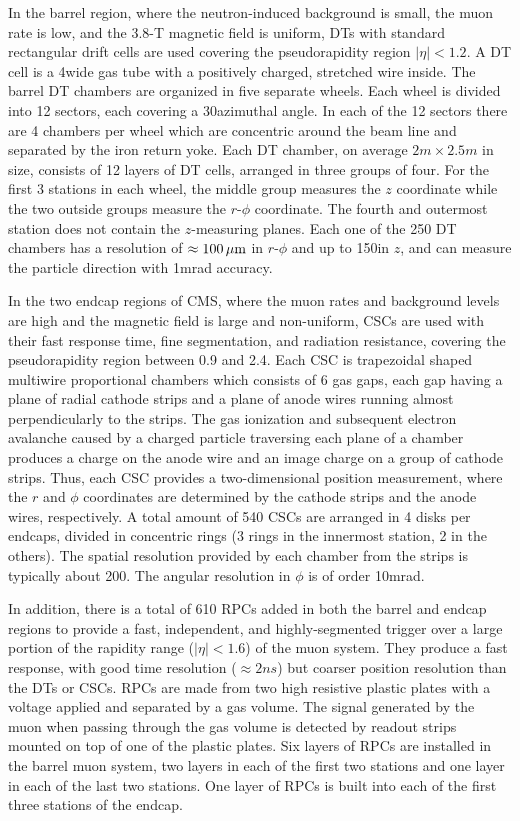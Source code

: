 In the barrel region, where the neutron-induced background is small, the muon rate is low, and the 3.8-T magnetic field is uniform, DTs with standard rectangular drift cells are used covering the pseudorapidity region $|\eta| < 1.2$. A DT cell is a 4\cm wide gas tube with a positively charged, stretched wire inside. 
The barrel DT chambers are organized in five separate wheels. Each wheel is divided into 12 sectors, each covering a 30\de azimuthal angle. In each of the 12 sectors there are 4 chambers per wheel which are concentric around the beam line and separated by the iron return yoke. Each DT chamber, on average $2\unit{m}\times2.5\unit{m}$ in size, consists of 12 layers of DT cells, arranged in three groups of four. For the first 3 stations in each wheel, the middle group measures the $z$ coordinate while the two outside groups measure the $r$-$\phi$ coordinate. The fourth and outermost station does not contain the $z$-measuring planes. Each one of the 250 DT chambers has a resolution of $\approx100\,\mu\text{m}$ in $r$-$\phi$ and up to 150\mum in $z$, and can measure the particle direction with 1\unit{mrad} accuracy.

In the two endcap regions of CMS, where the muon rates and background levels are high and the magnetic field is large and non-uniform, CSCs are used with their fast response time, fine segmentation, and radiation resistance, covering the pseudorapidity region between 0.9 and 2.4. 
Each CSC is trapezoidal shaped multiwire proportional chambers which consists of 6 gas gaps, each gap having a plane of radial cathode strips and a plane of anode wires running almost perpendicularly to the strips. The gas ionization and subsequent electron avalanche caused by a charged particle traversing each plane of a chamber produces a charge on the anode wire and an image charge on a group of cathode strips. Thus, each CSC provides a two-dimensional position measurement, where the $r$ and $\phi$ coordinates are determined by the cathode strips and the anode wires, respectively. A total amount of 540 CSCs are arranged in 4 disks per endcaps, divided in concentric rings (3 rings in the innermost station, 2 in the others). The spatial resolution provided by each chamber from the strips is typically about 200\mum. The angular resolution in $\phi$ is of order 10\unit{mrad}.

In addition, there is a total of 610 RPCs added in both the barrel and endcap regions to provide a fast, independent, and highly-segmented trigger over a large portion of the rapidity range ($|\eta| < 1.6$) of the muon system. They produce a fast response, with good time resolution ($\approx2\unit{ns}$) but coarser position resolution than the DTs or CSCs. RPCs are made from two high resistive plastic plates with a voltage applied and separated by a gas volume. The signal generated by the muon when passing through the gas volume is detected by readout strips mounted on top of one of the plastic plates. Six layers of RPCs are installed in the barrel muon system, two layers in each of the first two stations and one layer in each of the last two stations. One layer of RPCs is built into each of the first three stations of the endcap.

